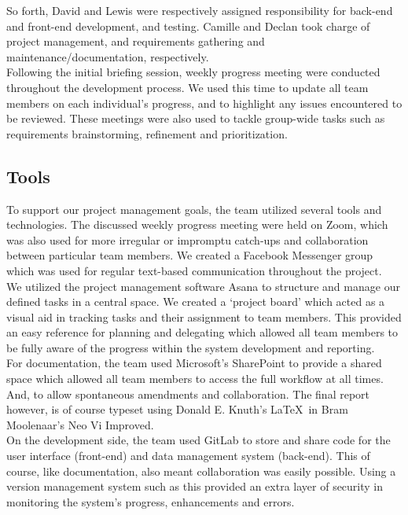 \documentclass[11pt, english]{article}
\begin{document}
	So forth, David and Lewis were respectively assigned responsibility for back-end and front-end development, and testing. Camille and Declan took charge of project management, and requirements gathering and maintenance/documentation, respectively.\\

	Following the initial briefing session, weekly progress meeting were conducted throughout the development process. We used this time to update all team members on each individual's progress, and to highlight any issues encountered to be reviewed. These meetings were also used to tackle group-wide tasks such as requirements brainstorming, refinement and prioritization.

	\subsection{Tools}

	To support our project management goals, the team utilized several tools and technologies. The discussed weekly progress meeting were held on Zoom, which was also used for more irregular or impromptu catch-ups and collaboration between particular team members. We created a Facebook Messenger group which was used for regular text-based communication throughout the project.\\

	We utilized the project management software Asana to structure and manage our defined tasks in a central space. We created a `project board' which acted as a visual aid in tracking tasks and their assignment to team members. This provided an easy reference for planning and delegating which allowed all team members to be fully aware of the progress within the system development and reporting.\\

	For documentation, the team used Microsoft's SharePoint to provide a shared space which allowed all team members to access the full workflow at all times. And, to allow spontaneous amendments and collaboration. The final report however, is of course typeset using Donald E. Knuth's \LaTeX\ in Bram Moolenaar's Neo Vi Improved.\\

	On the development side, the team used GitLab to store and share code for the user interface (front-end) and data management system (back-end). This of course, like documentation, also meant collaboration was easily possible. Using a version management system such as this provided an extra layer of security in monitoring the system's progress, enhancements and errors.
\end{document}

